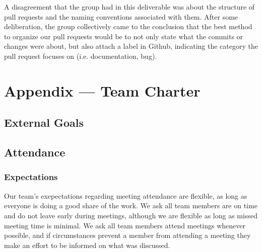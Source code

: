\documentclass{article}
\begin{document}
A disagreement that the group had in this deliverable was about the structure
of pull requests and the naming conventions associated with them. After some
deliberation, the group collectively came to the conclusion that the best
method to organize our pull requests would be to not only state what the
commits or changes were about, but also attach a label in Github, indicating
the category the pull request focuses on (i.e. documentation, bug).

\newpage{}

\section*{Appendix --- Team Charter}


\subsection*{External Goals}


\subsection*{Attendance}

\subsubsection*{Expectations}


Our team's exepectations regarding meeting attendance are flexible, as long as everyone is doing
a good share of the work. We ask all team members are on time and do not leave early during
meetings, although we are flexible as long as missed meeting time is minimal. We ask all team 
members attend meetings whenever possible, and if circumstances prevent a member from attending
a meeting they make an effort to be informed on what was discussed.
\end{document}
